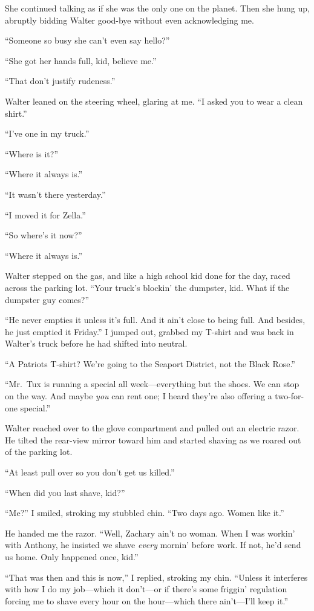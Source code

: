 She continued talking as if she was the only one on the planet. Then she
hung up, abruptly bidding Walter good-bye without even acknowledging me.

``Someone so busy she can't even say hello?''

``She got her hands full, kid, believe me.''

``That don't justify rudeness.''

Walter leaned on the steering wheel, glaring at me. ``I asked you to
wear a clean shirt.''

``I've one in my truck.''

``Where is it?''

``Where it always is.''

``It wasn't there yesterday.''

``I moved it for Zella.''

``So where's it now?''

``Where it always is.''

Walter stepped on the gas, and like a high school kid done for the day,
raced across the parking lot. ``Your truck's blockin' the dumpster, kid.
What if the dumpster guy comes?''

``He never empties it unless it's full. And it ain't close to being
full. And besides, he just emptied it Friday.'' I jumped out, grabbed my
T-shirt and was back in Walter's truck before he had shifted into
neutral.

``A Patriots T-shirt? We're going to the Seaport District, not the Black
Rose.''

``Mr.~Tux is running a special all week---everything but the shoes. We
can stop on the way. And maybe \emph{you} can rent one; I heard they're
also offering a two-for-one special.''

Walter reached over to the glove compartment and pulled out an electric
razor. He tilted the rear-view mirror toward him and started shaving as
we roared out of the parking lot.

``At least pull over so you don't get us killed.''

``When did you last shave, kid?''

``Me?'' I smiled, stroking my stubbled chin. ``Two days ago. Women like
it.''

He handed me the razor. ``Well, Zachary ain't no woman. When I was
workin' with Anthony, he insisted we shave \emph{every} mornin' before
work. If not, he'd send us home. Only happened once, kid.''

``That was then and this is now,'' I replied, stroking my chin. ``Unless
it interferes with how I do my job---which it don't---or if there's some
friggin' regulation forcing me to shave every hour on the hour---which
there ain't---I'll keep it.''


